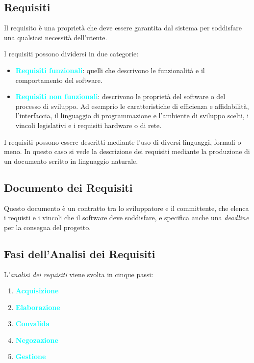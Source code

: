 \subsection{Requisiti}

\begin{definition}[Requisito]
    Il requisito è una proprietà che deve essere garantita dal sistema per soddisfare
    una qualsiasi necessità dell'utente.
\end{definition}

I requisiti possono dividersi in due categorie:
\begin{itemize}
    \item \textbf{\textcolor{cyan}{Requisiti funzionali}}: quelli che descrivono le funzionalità e il comportamento del software.
    \item \textbf{\textcolor{cyan}{Requisiti non funzionali}}: descrivono le proprietà del software o del processo di sviluppo. Ad esemprio le caratteristiche di
        efficienza e affidabilità, l'interfaccia, il linguaggio di programmazione e l'ambiente di sviluppo scelti, i vincoli legislativi e i requisiti hardware o di rete.
\end{itemize}

I requisiti possono essere descritti mediante l'uso di diversi linguaggi, formali o meno. In questo caso si vede
la descrizione dei requisiti mediante la produzione di un documento scritto in linguaggio naturale.

\subsection{Documento dei Requisiti}

Questo documento è un contratto tra lo sviluppatore e il committente, che elenca i requisti e i vincoli che il software deve soddisfare, e specifica
anche una \emph{deadline} per la consegna del progetto.

\subsection{Fasi dell'Analisi dei Requisiti}

L'\emph{analisi dei requisiti} viene svolta in cinque passi:
\begin{enumerate}
    \item \textbf{\textcolor{cyan}{Acquisizione}}
    \item \textbf{\textcolor{cyan}{Elaborazione}}
    \item \textbf{\textcolor{cyan}{Convalida}}
    \item \textbf{\textcolor{cyan}{Negozazione}}
    \item \textbf{\textcolor{cyan}{Gestione}}
\end{enumerate}

